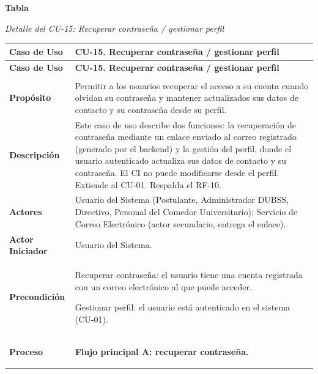 \label{tab:detalle_cu15}
\noindent\textbf{Tabla~\thetable}\par\nopagebreak
\noindent\textit{Detalle del CU-15: Recuperar contraseña / gestionar perfil}\par\nopagebreak
\begingroup\small\linespread{1}\selectfont
\begin{longtable}{>{\raggedright\arraybackslash}p{2.9cm} >{\raggedright\arraybackslash}p{12.6cm}}
\toprule
\textbf{Caso de Uso} & \textbf{CU-15. Recuperar contraseña / gestionar perfil} \\
\midrule
\endfirsthead
\toprule
\textbf{Caso de Uso} & \textbf{CU-15. Recuperar contraseña / gestionar perfil} \\
\midrule
\endhead
\endfoot
\bottomrule
\multicolumn{2}{l}{\textit{Nota.} Elaboración propia.} \\
\endlastfoot
\textbf{Propósito} & Permitir a los usuarios recuperar el acceso a su cuenta cuando olvidan su contraseña y mantener actualizados sus datos de contacto y su contraseña desde su perfil. \\
\midrule
\textbf{Descripción} & Este caso de uso describe dos funciones: la recuperación de contraseña mediante un enlace enviado al correo registrado (generado por el backend) y la gestión del perfil, donde el usuario autenticado actualiza sus datos de contacto y su contraseña. El CI no puede modificarse desde el perfil. Extiende al CU-01. Respalda el RF-10. \\
\midrule
\textbf{Actores} & Usuario del Sistema (Postulante, Administrador DUBSS, Directivo, Personal del Comedor Universitario); Servicio de Correo Electrónico (actor secundario, entrega el enlace). \\
\midrule
\textbf{Actor Iniciador} & Usuario del Sistema. \\
\midrule
\textbf{Precondición} & \vspace{-\baselineskip}\begin{cuvin}
    \item Recuperar contraseña: el usuario tiene una cuenta registrada con un correo electrónico al que puede acceder.
    \item Gestionar perfil: el usuario está autenticado en el sistema (CU-01).
\end{cuvin} \\
\midrule
\textbf{Proceso} & \textbf{Flujo principal A: recuperar contraseña.}
\begin{cupasos}

\end{cupasos}
\end{longtable}
